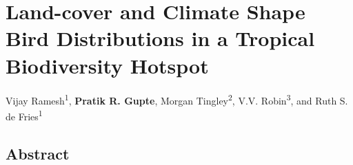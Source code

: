 
\chapter{Land-cover and Climate Shape Bird Distributions in a Tropical Biodiversity Hotspot}\label{ch:hillybirds}

{\noindent Vijay Ramesh\textsuperscript{1}, \textbf{Pratik R. Gupte}, Morgan Tingley\textsuperscript{2}, V.V. Robin\textsuperscript{3}, and Ruth S. de Fries\textsuperscript{1}}


\section*{Abstract}

